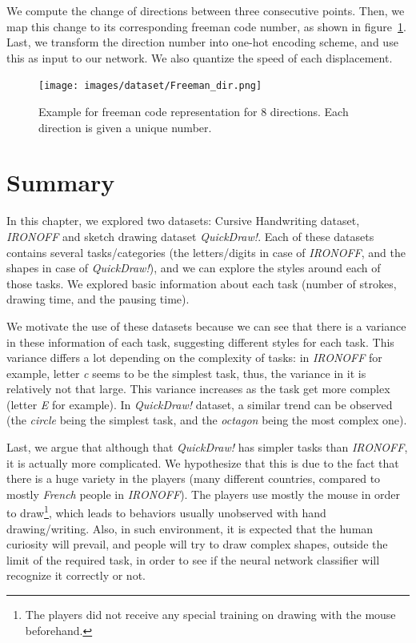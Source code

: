     \par We compute the change of directions between three consecutive points. Then, we map this change to its corresponding freeman code number, as shown in figure~\ref{fig:freeman_dir}. Last, we transform the direction number into one-hot encoding scheme, and use this as input to our network. We also quantize the speed of each displacement.

    \begin{figure}[htbp!]
    \centering
    \texttt{[image: images/dataset/Freeman\_dir.png]}
    \caption{Example for freeman code representation for 8 directions. Each direction is given a unique number.}
    \label{fig:freeman_dir}
    \end{figure}

\section{Summary}
  \par In this chapter, we explored two datasets: Cursive Handwriting dataset, \textit{IRONOFF} and sketch drawing dataset \textit{QuickDraw!}. Each of these datasets contains several tasks/categories (the letters/digits in case of \textit{IRONOFF}, and the shapes in case of \textit{QuickDraw!}), and we can explore the styles around each of those tasks. We explored basic information about each task (number of strokes, drawing time, and the pausing time).

  \par We motivate the use of these datasets because we can see that there is a variance in these information of each task, suggesting different styles for each task. This variance differs a lot depending on the complexity of tasks: in \textit{IRONOFF} for example, letter \textit{c} seems to be the simplest task, thus, the variance in it is relatively not that large. This variance increases as the task get more complex (letter \textit{E} for example). In \textit{QuickDraw!} dataset, a similar trend can be observed (the \textit{circle} being the simplest task, and the \textit{octagon} being the most complex one).

  \par Last, we argue that although that \textit{QuickDraw!} has simpler tasks than \textit{IRONOFF}, it is actually more complicated. We hypothesize that this is due to the fact that there is a huge variety in the players (many different countries, compared to mostly \textit{French} people in \textit{IRONOFF}). The players use mostly the mouse in order to draw\footnote{The players did not receive any special training on drawing with the mouse beforehand.}, which leads to behaviors usually unobserved with hand drawing/writing. Also, in such environment, it is expected that the human curiosity will prevail, and people will try to draw complex shapes, outside the limit of the required task, in order to see if the neural network classifier will recognize it correctly or not.

